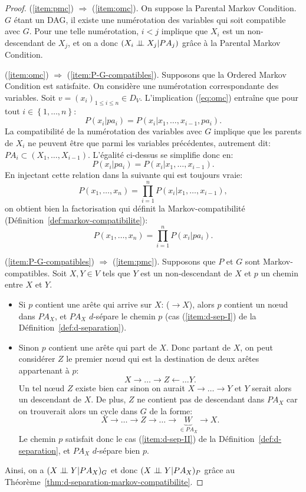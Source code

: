 \begin{proof}
(\ref{item:pmc}) $\Longrightarrow$ (\ref{item:omc}). On suppose la Parental Markov Condition. 
$G$ étant un DAG, il existe une numérotation des variables qui soit compatible avec $G$. 
Pour une telle numérotation, $i<j$ implique que $X_i$ est un non-descendant de $X_j$, et on a donc $(X_i\perp\!\!\!\perp X_j|PA_j)$ grâce à la Parental Markov Condition.

(\ref{item:omc}) $\Longrightarrow$ (\ref{item:P-G-compatibles}).
Supposons que la Ordered Markov Condition est satisfaite. On considère une numérotation correspondante des variables.
Soit $v=(x_i)_{1\leqslant i\leqslant n}\in D_V$.
L'implication (\ref{eq:omc}) entraîne que pour tout $i\in \left\{ 1,\dots,n \right\}$:
\[ P(x_i|pa_i)=P(x_i|x_1,\dots,x_{i-1},pa_i). \] 
La compatibilité de la numérotation des variables avec $G$ implique que les parents de $X_i$ ne peuvent être que parmi les variables précédentes, autrement dit:  $PA_i\subset (X_1,\dots,X_{i-1})$. L'égalité ci-dessus se simplifie donc en:
\[ P(x_i|pa_i)=P(x_i|x_1,\dots,x_{i-1}). \]
En injectant cette relation dans la suivante qui est toujours vraie:
\[ P(x_1,\dots,x_n)=\prod_{i=1}^nP(x_i|x_1,\dots,x_{i-1}), \]
on obtient bien la factorisation qui définit la Markov-compatibilité (Définition~\ref{def:markov-compatibilite}):
\[ P(x_1,\dots,x_n)=\prod_{i=1}^nP(x_i|pa_i). \]

(\ref{item:P-G-compatibles}) $\Longrightarrow$ (\ref{item:pmc}). Supposons que $P$ et $G$ sont Markov-compatibles.
Soit $X,Y\in V$ tels que $Y$ est un non-descendant de $X$ et $p$ un chemin entre $X$ et $Y$.
\begin{itemize}
\item Si $p$ contient une arête qui arrive sur $X$: ($\to X$), alors
  $p$ contient un n\oe ud dans $PA_X$, et $PA_X$  $d$-sépare
  le chemin $p$ (cas (\ref{item:d-sep-I}) de la Définition~\ref{def:d-separation}).
\item Sinon $p$ contient une arête qui part de $X$. Donc partant de
  $X$, on peut considérer $Z$ le premier n\oe ud qui est la
  destination de deux arêtes appartenant à $p$:
\[ X\to \dots \to Z\leftarrow \dots Y. \]
Un tel n\oe ud $Z$ existe bien car sinon on aurait $X\to \dots \to Y$
et $Y$ serait alors un descendant de $X$. De plus, $Z$ ne contient pas
de descendant dans $PA_X$ car on trouverait alors un cycle dans $G$ de
la forme:
\[ X\to \dots \to Z\to \dots \to \underbrace{W}_{\in PA_X}\to X. \]
Le chemin $p$ satisfait donc le cas (\ref{item:d-sep-II}) de la Définition~\ref{def:d-separation}, et $PA_X$  $d$-sépare bien $p$.
\end{itemize}
Ainsi, on a $(X\perp\!\!\!\perp Y|PA_X)_G$ et donc $(X\perp\!\!\!\perp Y|PA_X)_P$ grâce au Théorème~\ref{thm:d-separation-markov-compatibilite}.
\end{proof}

